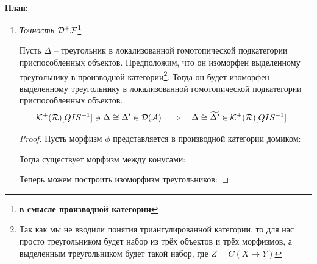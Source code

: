 \documentclass[../main.tex]{subfiles}
\begin{document}
     \\
\textbf{План:} %
\begin{enumerate}
     \item \textit{Точность $\mathcal{D^+ F}$}\footnote{\textbf{в смысле производной категории}}
\begin{to_lem}
Пусть $\Delta$ -- треугольник в локализованной гомотопической подкатегории приспособленных объектов. Предположим, что он изоморфен выделенному треугольнику в производной категории\footnote{Так как мы не вводили понятия триангулированной категории, то для нас просто треугольником будет набор из трёх объектов и трёх морфизмов, а выделенным треугольником будет такой набор, где $Z = C(X \to Y)$}. Тогда он будет изоморфен выделенному треугольнику в локализованной гомотопической подкатегории приспособленных объектов.
\begin{align*}
    \mathcal{K^+(\mathcal{R})}[QIS^{-1}] \ni \Delta &\cong \Delta' \in \mathcal{D(\mathcal{A})} \quad \Rightarrow \quad \Delta \cong \widetilde{\Delta'} \in \mathcal{K^+(R)}[QIS^{-1}]
\end{align*}
\end{to_lem}
\begin{proof}
    \bee
{}
    \eee
Пусть морфизм $\phi$ представляется  в производной категории домиком:
    \bee
{}
    \eee
    Тогда существует морфизм между конусами:
    \bee
    \eee
    Теперь можем построить изоморфизм треугольников:
    \bee
    \eee

\end{proof}
\end{enumerate}
\end{document}
